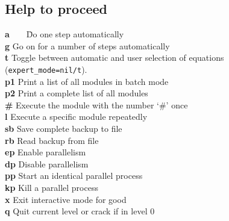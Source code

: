 \documentclass[12pt]{article}
\begin{document}
\subsection{Help to proceed} 
\begin{tabbing}
  {\bf a}\ \ \ \ \= Do one step automatically      \\        
  {\bf g}    \> Go on for a number of steps automatically    \\
  {\bf t}    \> Toggle between automatic and user selection of 
                equations ({\tt expert\_mode=nil/t}).  \\
  {\bf p1}   \> Print a list of all modules in batch mode \\
  {\bf p2}   \> Print a complete list of all modules \\
  {\bf \#}   \> Execute the module with the number `\#' once  \\
  {\bf l}    \> Execute a specific module repeatedly         \\
  {\bf sb}   \> Save complete backup to file \\
  {\bf rb}   \> Read backup from file \\
  {\bf ep}   \> Enable parallelism \\
  {\bf dp}   \> Disable parallelism \\
  {\bf pp}   \> Start an identical parallel process \\
  {\bf kp}   \> Kill a parallel process \\
  {\bf x}    \> Exit interactive mode for good            \\
  {\bf q}    \> Quit current level or crack if in level 0    \\        
\end{tabbing}
\end{document}
